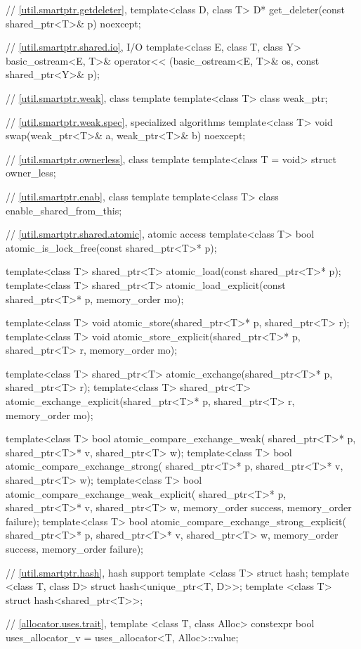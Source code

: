 \begin{codeblock}
{  // \ref{util.smartptr.getdeleter},  
  template<class D, class T>
    D* get_deleter(const shared_ptr<T>& p) noexcept;

  // \ref{util.smartptr.shared.io},  I/O
  template<class E, class T, class Y>
    basic_ostream<E, T>& operator<< (basic_ostream<E, T>& os, const shared_ptr<Y>& p);

  // \ref{util.smartptr.weak}, class template 
  template<class T> class weak_ptr;

  // \ref{util.smartptr.weak.spec},  specialized algorithms
  template<class T> void swap(weak_ptr<T>& a, weak_ptr<T>& b) noexcept;

  // \ref{util.smartptr.ownerless}, class template 
  template<class T = void> struct owner_less;

  // \ref{util.smartptr.enab}, class template 
  template<class T> class enable_shared_from_this;

  // \ref{util.smartptr.shared.atomic},  atomic access
  template<class T>
    bool atomic_is_lock_free(const shared_ptr<T>* p);

  template<class T>
    shared_ptr<T> atomic_load(const shared_ptr<T>* p);
  template<class T>
    shared_ptr<T> atomic_load_explicit(const shared_ptr<T>* p, memory_order mo);

  template<class T>
    void atomic_store(shared_ptr<T>* p, shared_ptr<T> r);
  template<class T>
    void atomic_store_explicit(shared_ptr<T>* p, shared_ptr<T> r, memory_order mo);

  template<class T>
    shared_ptr<T> atomic_exchange(shared_ptr<T>* p, shared_ptr<T> r);
  template<class T>
    shared_ptr<T> atomic_exchange_explicit(shared_ptr<T>* p, shared_ptr<T> r, memory_order mo);

  template<class T>
    bool atomic_compare_exchange_weak(
      shared_ptr<T>* p, shared_ptr<T>* v, shared_ptr<T> w);
  template<class T>
    bool atomic_compare_exchange_strong(
      shared_ptr<T>* p, shared_ptr<T>* v, shared_ptr<T> w);
  template<class T>
    bool atomic_compare_exchange_weak_explicit(
      shared_ptr<T>* p, shared_ptr<T>* v, shared_ptr<T> w,
      memory_order success, memory_order failure);
  template<class T>
    bool atomic_compare_exchange_strong_explicit(
      shared_ptr<T>* p, shared_ptr<T>* v, shared_ptr<T> w,
      memory_order success, memory_order failure);

  // \ref{util.smartptr.hash}, hash support
  template <class T> struct hash;
  template <class T, class D> struct hash<unique_ptr<T, D>>;
  template <class T> struct hash<shared_ptr<T>>;

  // \ref{allocator.uses.trait}, 
  template <class T, class Alloc>
    constexpr bool uses_allocator_v = uses_allocator<T, Alloc>::value;
}
\end{codeblock}


